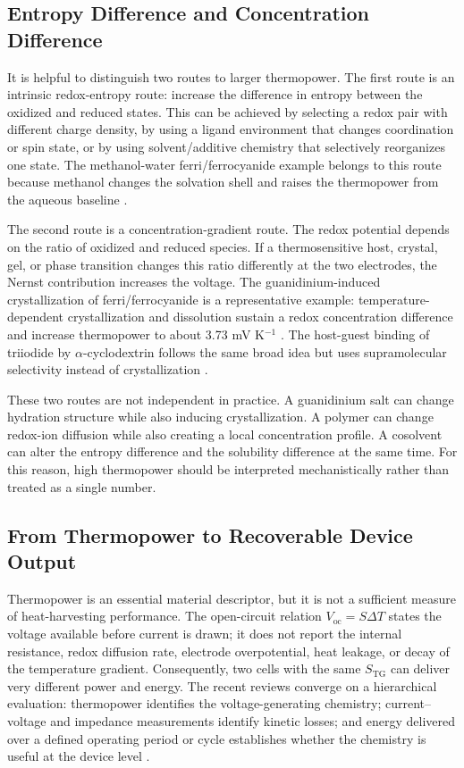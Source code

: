 \subsection{Entropy Difference and Concentration Difference}

It is helpful to distinguish two routes to larger thermopower. The first route
is an intrinsic redox-entropy route: increase the difference in entropy between
the oxidized and reduced states. This can be achieved by selecting a redox pair
with different charge density, by using a ligand environment that changes
coordination or spin state, or by using solvent/additive chemistry that
selectively reorganizes one state. The methanol-water ferri/ferrocyanide
example belongs to this route because methanol changes the solvation shell and
raises the thermopower from the aqueous baseline \citep{kim2017high}.

The second route is a concentration-gradient route. The redox potential depends
on the ratio of oxidized and reduced species. If a thermosensitive host,
crystal, gel, or phase transition changes this ratio differently at the two
electrodes, the Nernst contribution increases the voltage. The
guanidinium-induced crystallization of ferri/ferrocyanide is a representative
example: temperature-dependent crystallization and dissolution sustain a redox
concentration difference and increase thermopower to about 3.73 mV K$^{-1}$
\citep{yu2020thermosensitive}. The host-guest binding of triiodide by
$\alpha$-cyclodextrin follows the same broad idea but uses supramolecular
selectivity instead of crystallization \citep{zhou2016supramolecular}.

These two routes are not independent in practice. A guanidinium salt can change
hydration structure while also inducing crystallization. A polymer can change
redox-ion diffusion while also creating a local concentration profile. A
cosolvent can alter the entropy difference and the solubility difference at the
same time. For this reason, high thermopower should be interpreted mechanistically
rather than treated as a single number.

\subsection{From Thermopower to Recoverable Device Output}

Thermopower is an essential material descriptor, but it is not a sufficient
measure of heat-harvesting performance. The open-circuit relation
$V_{\mathrm{oc}}=S\Delta T$ states the voltage available before current is
drawn; it does not report the internal resistance, redox diffusion rate,
electrode overpotential, heat leakage, or decay of the temperature gradient.
Consequently, two cells with the same $S_{\mathrm{TG}}$ can deliver very
different power and energy. The recent reviews converge on a hierarchical
evaluation: thermopower identifies the voltage-generating chemistry;
current--voltage and impedance measurements identify kinetic losses; and
energy delivered over a defined operating period or cycle establishes whether
the chemistry is useful at the device level
\citep{duan2021liquid,jabeen2024recent,shang2026pushing,xu2026birdseye}.


